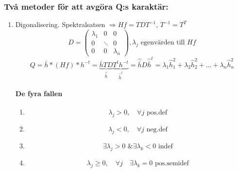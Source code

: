 \documentclass{article}
\begin{document}
\subsubsection{Två metoder för att avgöra Q:s karaktär:}
\begin{enumerate}
\item Digonalisering. Spektralsatsen $\Rightarrow Hf = TDT^{-1}$, $T^{-1} = T^T$
$$
	D = 
	\begin{pmatrix}
		\lambda_1 & 0 & 0 \\
		0 & \ddots & 0 \\
		0 & 0 & \lambda_n
	\end{pmatrix} 
	, \lambda_j \text{ egenvärden till } Hf
$$
$$
	Q = \bar{h}*(Hf)*h^{-t} = \underbrace{\bar{h}TD}_{\hat{\bar{h}}}\underbrace{T^th^{-t}}_{\hat{\bar{h}}^t} = \hat{\bar{h}}D\hat{\bar{h}}^t = \lambda_1\hat{h}^2_1 + \lambda_2\hat{h}^2_2 + \ldots + \lambda_n\hat{h}^2_n
$$

\paragraph{De fyra fallen}
\begin{enumerate}
\item 
$$ \lambda_j > 0, \quad \forall j \text{ pos.def} $$
\item 
$$ \lambda_j < 0, \quad \forall j \text{ neg.def} $$
\item 
$$ \exists\lambda_j > 0 \text{ \& } \exists\lambda_k < 0 \text{ indef} $$
\item 
$$ \lambda_j \geq 0, \quad \forall j \quad\exists\lambda_k = 0 \text{ pos.semidef} $$
\end{enumerate}


\end{enumerate}
\end{document}
